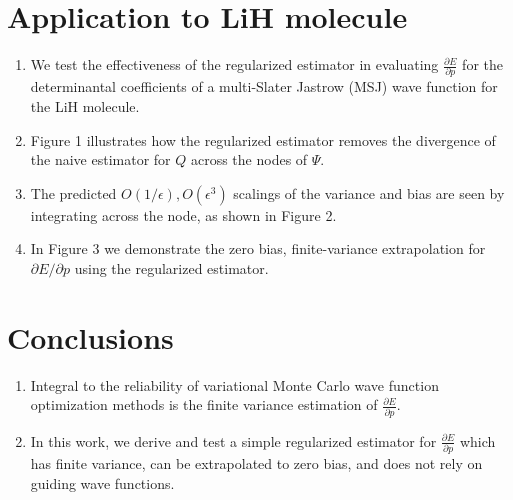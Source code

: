 \documentclass{article}
\begin{document}
\section{Application to LiH molecule}
\begin{enumerate}
\item We test the effectiveness of the regularized estimator in evaluating $\frac{\partial E}{\partial p}$ for the determinantal coefficients of a multi-Slater Jastrow (MSJ) wave function for the LiH molecule.

\item Figure 1 illustrates how the regularized estimator removes the divergence of the naive estimator for $Q$ across the nodes of $\Psi$.

\item The predicted $O(1/\epsilon), O(\epsilon^3)$ scalings of the variance and bias are seen by integrating across the node, as shown in Figure 2. 

\item In Figure 3 we demonstrate the zero bias, finite-variance extrapolation for $\partial E/\partial p$ using the regularized estimator.
\end{enumerate}

\section{Conclusions}
\begin{enumerate}
\item Integral to the reliability of variational Monte Carlo wave function optimization methods is the finite variance estimation of $\frac{\partial E}{\partial p}$.

\item  In this work, we derive and test a simple regularized estimator for $\frac{\partial E}{\partial p}$ which has finite variance, can be extrapolated to zero bias, and does not rely on guiding wave functions.
\end{enumerate}



\end{document}

